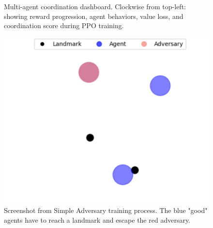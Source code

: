\begin{figure}[htpb]
    \centering
    
    \caption{Multi-agent coordination dashboard. Clockwise from top-left: showing reward progression, agent behaviors, value loss, and coordination score during PPO training.}
    \label{fig:training_dashboard}
\end{figure}

\begin{figure}[htpb]
    \centering
    \includegraphics[width=0.75\linewidth]{latex/imgs/adversary_anim.png}
    \caption{Screenshot from Simple Adversary training process. The blue "good" agents have to reach a landmark and escape the red adversary.}
    \label{fig:adversary}
\end{figure}
